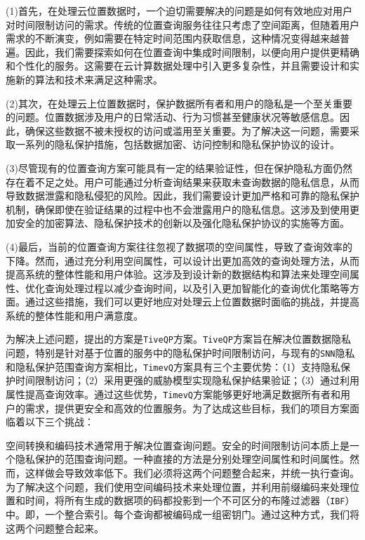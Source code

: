 \documentclass{cumcmthesis}
\numberwithin{equation}{section} %
\numberwithin{figure}{section} %
\numberwithin{table}{section} %
\begin{document}
(1)首先，在处理云位置数据时，一个迫切需要解决的问题是如何有效地应对用户对时间限制访问的需求。传统的位置查询服务往往只考虑了空间距离，但随着用户需求的不断演变，例如需要在特定时间范围内获取信息，这种情况变得越来越普遍。因此，我们需要探索如何在位置查询中集成时间限制，以便向用户提供更精确和个性化的服务。这需要在云计算数据处理中引入更多复杂性，并且需要设计和实施新的算法和技术来满足这种需求。

(2)其次，在处理云上位置数据时，保护数据所有者和用户的隐私是一个至关重要的问题。位置数据涉及用户的日常活动、行为习惯甚至健康状况等敏感信息。因此，确保这些数据不被未授权的访问或滥用至关重要。为了解决这一问题，需要采取一系列的隐私保护措施，包括数据加密、访问控制和隐私保护协议的设计。

(3)尽管现有的位置查询方案可能具有一定的结果验证性，但在保护隐私方面仍然存在着不足之处。用户可能通过分析查询结果来获取未查询数据的隐私信息，从而导致数据泄露和隐私侵犯的风险。因此，我们需要设计更加严格和可靠的隐私保护机制，确保即使在验证结果的过程中也不会泄露用户的隐私信息。这涉及到使用更加安全的加密算法、隐私保护技术的创新以及强化隐私保护协议的实施等方面。

(4)最后，当前的位置查询方案往往忽视了数据项的空间属性，导致了查询效率的下降。然而，通过充分利用空间属性，可以设计出更加高效的查询处理方法，从而提高系统的整体性能和用户体验。这涉及到设计新的数据结构和算法来处理空间属性、优化查询处理过程以减少查询时间，以及引入更加智能化的查询优化策略等方面。通过这些措施，我们可以更好地应对处理云上位置数据时面临的挑战，并提高系统的整体性能和用户满意度。

为解决上述问题，提出的方案是\texttt{TiveQP}方案。\texttt{TiveQP}方案旨在解决位置数据隐私问题，特别是针对基于位置的服务中的隐私保护时间限制访问，与现有的\texttt{SNN}隐私和隐私保护范围查询方案相比，\texttt{TimevQ}方案具有三个主要优势：（1）支持隐私保护时间限制访问；（2）采用更强的威胁模型实现隐私保护结果验证；（3）通过利用属性提高查询效率。通过这些优势，\texttt{TimevQ}方案能够更好地满足数据所有者和用户的需求，提供更安全和高效的位置服务。为了达成这些目标，我们的项目方案面临着以下三个挑战：

\textbf{\bfseries{}}空间转换和编码技术通常用于解决位置查询问题。安全的时间限制访问本质上是一个隐私保护的范围查询问题。一种直接的方法是分别处理空间属性和时间属性。然而，这样做会导致效率低下。我们必须将这两个问题整合起来，并统一执行查询。为了解决这个问题，我们使用空间编码技术来处理位置，并利用前缀编码来处理位置和时间，将所有生成的数据项的码都投影到一个不可区分的布隆过滤器（\texttt{IBF}）中。即，一个整合索引。每个查询都被编码成一组密钥门。通过这种方式，我们将这两个问题整合起来。
\end{document}
